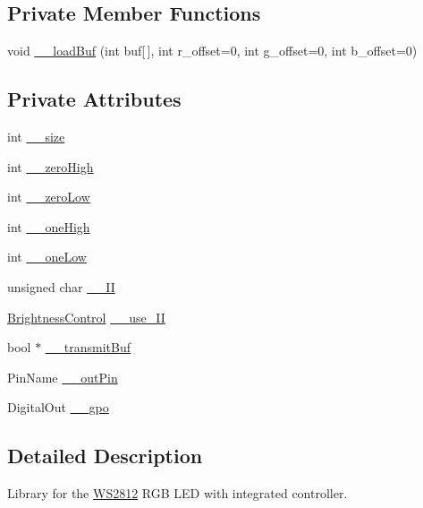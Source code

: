 \subsection*{Private Member Functions}
\begin{DoxyCompactItemize}
\item 
void \hyperlink{class_w_s2812_adfe7d119deac16639f987130f5db724e}{\+\_\+\+\_\+load\+Buf} (int buf\mbox{[}$\,$\mbox{]}, int r\+\_\+offset=0, int g\+\_\+offset=0, int b\+\_\+offset=0)
\end{DoxyCompactItemize}
\subsection*{Private Attributes}
\begin{DoxyCompactItemize}
\item 
int \hyperlink{class_w_s2812_a5623ee0fd628d54483c0427f30f4d568}{\+\_\+\+\_\+size}
\item 
int \hyperlink{class_w_s2812_a44dea9eca691fddccd0637af24c028d8}{\+\_\+\+\_\+zero\+High}
\item 
int \hyperlink{class_w_s2812_addde539bd94ea4a670420c22cace2216}{\+\_\+\+\_\+zero\+Low}
\item 
int \hyperlink{class_w_s2812_acef8597fa4d4a31916a1460de124026e}{\+\_\+\+\_\+one\+High}
\item 
int \hyperlink{class_w_s2812_ab6d118fa4ae51618675d284fc7130fdd}{\+\_\+\+\_\+one\+Low}
\item 
unsigned char \hyperlink{class_w_s2812_a90cb6ef1c50bfa6b2d1a7e6100adead7}{\+\_\+\+\_\+\+II}
\item 
\hyperlink{class_w_s2812_a14186f70863bf4f3a35b2cc21b15642d}{Brightness\+Control} \hyperlink{class_w_s2812_a249d1039add9ef099574fc4a52aa1235}{\+\_\+\+\_\+use\+\_\+\+II}
\item 
bool $\ast$ \hyperlink{class_w_s2812_a345b0895fb037ed603a79806bb7e510c}{\+\_\+\+\_\+transmit\+Buf}
\item 
Pin\+Name \hyperlink{class_w_s2812_a8e08f8b78b58930cef508a4a66a27916}{\+\_\+\+\_\+out\+Pin}
\item 
Digital\+Out \hyperlink{class_w_s2812_a37c5f3871012186c92a1bf856ca888ee}{\+\_\+\+\_\+gpo}
\end{DoxyCompactItemize}


\subsection{Detailed Description}
Library for the \hyperlink{class_w_s2812}{W\+S2812} R\+GB L\+ED with integrated controller. 


